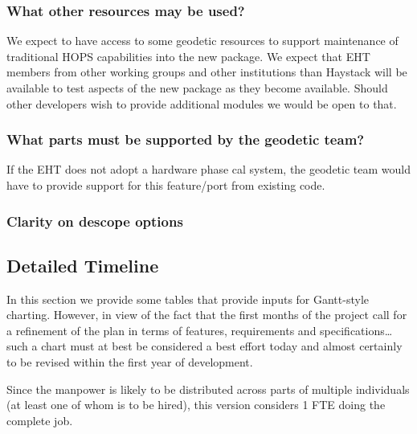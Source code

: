 \subsubsection{What other resources may be used?}
\label{sec:otherbodies}
We expect to have access to some geodetic resources to support
maintenance of traditional HOPS capabilities into the new package.
We expect that EHT members from other working groups and other
institutions than Haystack will be available to test aspects of
the new package as they become available.  Should other developers
wish to provide additional modules we would be open to that.

\subsubsection{What parts must be supported by the geodetic team?}
\label{sec:geodesy}
If the EHT does not adopt a hardware phase cal system, the
geodetic team would have to provide support for this feature/port from existing code.

\subsubsection{Clarity on descope options}
\label{sec:descope}



\subsection{Detailed Timeline}
\label{sec:timetables}

In this section we provide some tables that provide inputs for Gantt-style
charting.  However, in view of the fact that the first months of the project
call for a refinement of the plan in terms of features, requirements and
specifications\dots such a chart must at best be considered a best effort
today and almost certainly to be revised within the first year of development.

Since the manpower is likely to be distributed across parts of multiple
individuals (at least one of whom is to be hired), this version considers
1 FTE doing the complete job.

